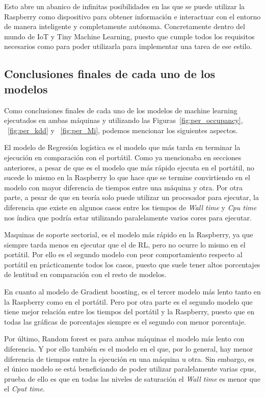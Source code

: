 \documentclass[a4paper, 12pt]{book}
\begin{document}
Esto abre un abanico de infinitas posibilidades en las que se puede utilizar la Raspberry como dispositivo para obtener información e interactuar con el entorno de manera inteligente y completamente autónoma. Concretamente dentro del mundo de IoT y Tiny Machine Learning, puesto que cumple todos los requisitos necesarios como para poder utilizarla para implementar una tarea de ese estilo.

\subsection{Conclusiones finales de cada uno de los modelos}

Como conclusiones finales de cada uno de los modelos de machine learning ejecutados en ambas máquinas y utilizando las Figuras~\ref{fig:per_occupancy}, ~\ref{fig:per_kdd} y ~\ref{fig:per_Mi}, podemos mencionar los siguientes aspectos.

El modelo de Regresión logística es el modelo que más tarda en terminar la ejecución en comparación con el portátil. Como ya mencionaba en secciones anteriores, a pesar de que es el modelo que más rápido ejecuta en el portátil, no sucede lo mismo en la Raspberry lo que hace que se termine convirtiendo en el modelo con mayor diferencia de tiempos entre una máquina y otra. Por otra parte, a pesar de que en teoría solo puede utilizar un procesador para ejecutar, la diferencia que existe en algunos casos entre los tiempos de \textit{Wall time} y \textit{Cpu time} nos índica que podría estar utilizando paralelamente varios cores para ejecutar.

Maquinas de soporte sectorial, es el modelo más rápido en la Raspberry, ya que siempre tarda menos en ejecutar que el de RL, pero no ocurre lo mismo en el portátil. Por ello es el segundo modelo con peor comportamiento respecto al portátil en prácticamente todos los casos, puesto que suele tener altos porcentajes de lentitud en comparación con el resto de modelos.

En cuanto al modelo de Gradient boosting, es el tercer modelo más lento tanto en la Raspberry como en el portátil. Pero por otra parte es el segundo modelo que tiene mejor relación entre los tiempos del portátil y la Raspberry, puesto que en todas las gráficas de porcentajes siempre es el segundo con menor porcentaje.

Por último, Random forest es para ambas máquinas el modelo más lento con diferencia. Y por ello también es el modelo en el que, por lo general, hay menor diferencia de tiempos entre la ejecución en una máquina u otra. Sin embargo, es el único modelo se está beneficiando de poder utilizar paralelamente varias cpus, prueba de ello es que en todas las niveles de saturación el \textit{Wall time} es menor que el \textit{Cput time}.
\end{document}
